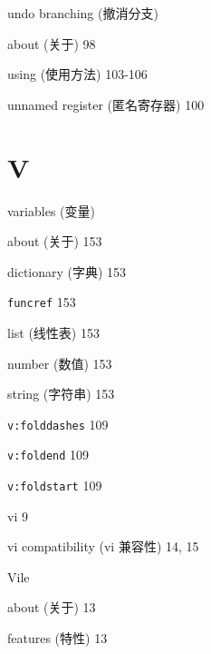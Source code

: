 \begin{multicols}{2}
\hangindent=3pc  undo branching (撤消分支) \par
\hangindent=3pc \quad about (关于) 98 \par
\hangindent=3pc \quad using (使用方法) 103-106 \par

\hangindent=3pc  unnamed register (匿名寄存器) 100

\hangindent=3pc  \section*{V}

\hangindent=3pc  variables (变量) \par
\hangindent=3pc \quad about (关于) 153 \par
\hangindent=3pc \quad dictionary (字典) 153 \par
\hangindent=3pc \quad \texttt{funcref} 153 \par
\hangindent=3pc \quad list (线性表) 153 \par
\hangindent=3pc \quad number (数值) 153 \par
\hangindent=3pc \quad string (字符串) 153 \par

\hangindent=3pc  \texttt{v:folddashes} 109

\hangindent=3pc  \texttt{v:foldend} 109

\hangindent=3pc  \texttt{v:foldstart} 109

\hangindent=3pc  vi 9

\hangindent=3pc  vi compatibility (vi 兼容性) 14, 15

\hangindent=3pc  Vile \par
\hangindent=3pc \quad about (关于) 13 \par
\hangindent=3pc \quad features (特性) 13 \par


\end{multicols}

